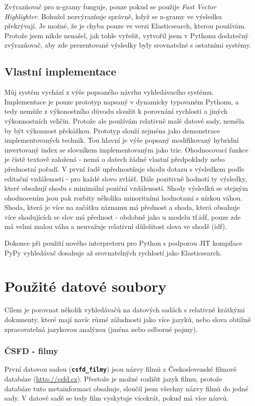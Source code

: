 \documentclass[11pt,letterpaper,oneside,openright]{book}
\newcommand{\bftt}[1]{\texttt{\textbf{#1}}}
\begin{document}
Zvýrazňovač pro n-gramy funguje, pouze pokud se použije \textit{Fast Vector
Highlighter}. Bohužel nezvýrazňuje správně, když se n-gramy ve výsledku
překrývají. Je možné, že je chyba pouze ve verzi Elasticsearch, kterou
používám. Protože jsem nikde nenašel, jak tohle vyřešit, vytvořil jsem v
Pythonu dodatečný zvýrazňovač, aby zde prezentované výsledky byly srovnatelné s
ostatními systémy.

\subsection{Vlastní implementace}
Můj systém vychází z výše popsaného návrhu vyhledávacího systému. Implementace
je pouze prototyp napsaný v dynamicky typovaném Pythonu, a tedy nemůže z
výkonostního důvodu sloužit k porovnání rychlosti a jiných výkonnostních
veličin. Protože ale používám relativně malé datové sady, neměla by být
výkonnost překážkou. Prototyp slouží zejména jako demonstrace implementovaných
technik. Tou hlavní je výše popsaný modifikovaný hybridní invertovaný index se
slovníkem implementovaným jako trie.  Ohodnocovací funkce je čistě textově
založená - nemá o datech žádné vlastní předpoklady nebo přednostní pořadí. V
první řadě upřednostňuje shodu dotazu s výsledkem podle editační vzdálenosti -
pro každé slovo zvlášť. Dále pozitivně hodnotí ty výsledky, které obsahují
shodu s minimální poziční vzdáleností.  Shody výsledků se stejným ohodnocením
jsou pak rozbity několika minoritními hodnotami s nízkou váhou. Shoda, která je
více na začátku záznamu má přednost a shoda, která obsahuje více shodujících se
slov má přednost - obdobně jako u modelu tf.idf, pouze zde má velmi malou váhu
a neuvažuje relativní důležitost slova ve shodě (idf).

Dokonce při použití nového interpreteru pro Python s podporou JIT
kompilace PyPy vyhledávač dosahuje až srovnatelných rychlostí jako
Elasticsearch.


\section{Použité datové soubory}
Cílem je porovnat několik vyhledávačů na datových sadách s relativně krátkými
dokumenty, které mají navíc různé záludnosti jako více jazyků, nebo slova
obtížně zpracovatelná jazykovou analýzou (jména nebo odborné pojmy).

\subsubsection{ČSFD - filmy}
První datovou sadou (\bftt{csfd\_filmy}) jsou názvy filmů z Československé
filmové databáze (\url{http://csfd.cz}). Přestože je možné rozlišit jazyk
filmu, protože databáze tuto metainformaci obsahuje, sloučil jsem všechny názvy
filmů do jedné sady. V datové sadě se tedy film vyskytuje vícekrát, pokud má
více názvů.
\end{document}
